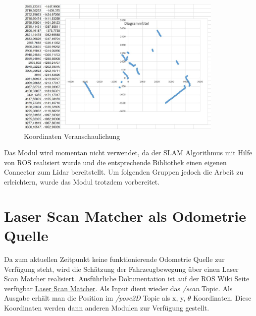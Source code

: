 \vspace{0.4cm}
\begin{figure}[h]
\begin{center}
\includegraphics[width=10cm]{images/chapter5/kartKoord.JPG}
\caption{Koordinaten Veranschaulichung}
\label{Koordinaten_veranschaulichung}
\end{center}
\end{figure}



Das Modul wird momentan nicht verwendet, da der SLAM Algorithmus mit Hilfe von ROS realisiert wurde und die entsprechende Bibliothek einen eigenen Connector zum Lidar bereitstellt. Um folgenden Gruppen jedoch die Arbeit zu erleichtern, wurde das Modul trotzdem vorbereitet.











\section{Laser Scan Matcher als Odometrie Quelle}

Da zum aktuellen Zeitpunkt keine funktionierende Odometrie Quelle zur Verfügung steht, wird die Schätzung der Fahrzeugbewegung über einen Laser Scan Matcher realisiert. Ausführliche Dokumentation ist auf der ROS Wiki Seite verfügbar \href{http://wiki.ros.org/laser_scan_matcher}{Laser Scan Matcher}. Als Input dient wieder das \textit{/scan} Topic. Als Ausgabe erhält man die Position im \textit{/pose2D} Topic als x, y, $\theta$ Koordinaten. Diese Koordinaten werden dann anderen Modulen zur Verfügung gestellt. 









